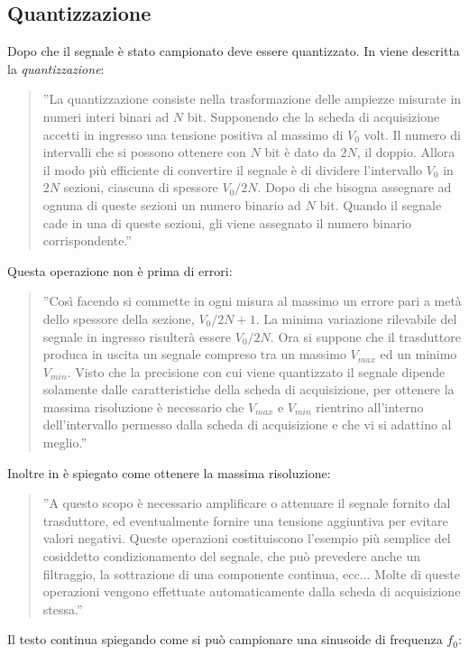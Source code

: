 \documentclass[a4paper]{report} %
\begin{document}
\subsection{Quantizzazione}
Dopo che il segnale è stato campionato deve essere quantizzato. In \cite{art:rif.2} viene descritta la \textit{quantizzazione}:
\begin{quote}
	''La quantizzazione consiste nella trasformazione delle ampiezze misurate in numeri interi binari ad $N$ bit. Supponendo che la scheda di acquisizione accetti in ingresso una tensione positiva al massimo di $ V_{0} $ volt. Il numero di intervalli che si possono ottenere con $N$ bit è dato da $2N$, il doppio. Allora il modo più efficiente di convertire il segnale è di dividere l'intervallo $ V_{0} $ in $2N$ sezioni, ciascuna di spessore $ V_{0}/2N $. Dopo di che bisogna assegnare ad ognuna di queste sezioni un numero binario ad $N$ bit. Quando il segnale cade in una di queste sezioni, gli viene assegnato il numero binario corrispondente.''
\end{quote}
Questa operazione non è prima di errori:
\begin{quote}	
	 ''Così facendo si commette in ogni misura al massimo un errore pari a metà dello spessore della sezione, $ V_{0}/2N+1 $. La minima variazione rilevabile del segnale in ingresso risulterà essere $ V_{0}/2N $. Ora si suppone che il trasduttore produca in uscita un segnale compreso tra un massimo $ V_{max} $ ed un minimo $ V_{min} $. Visto che la precisione con cui viene quantizzato il segnale dipende solamente dalle caratteristiche della scheda di acquisizione, per ottenere la massima risoluzione è necessario che $V_{max}$ e $V_{min}$ rientrino all'interno dell'intervallo permesso dalla scheda di acquisizione e che vi si adattino al meglio.''
\end{quote}	 
Inoltre in \cite{art:rif.2} è spiegato come ottenere la massima risoluzione:
\begin{quote}	  
	''A questo scopo è necessario amplificare o attenuare il segnale fornito dal trasduttore, ed eventualmente fornire una tensione aggiuntiva per evitare valori negativi. Queste operazioni costituiscono l'esempio più semplice del cosiddetto condizionamento del segnale, che può prevedere anche un filtraggio, la sottrazione di una componente continua, ecc... Molte di queste operazioni vengono effettuate automaticamente dalla scheda di acquisizione stessa.''
\end{quote}
Il testo continua spiegando come si può campionare una sinusoide di frequenza $f_{0}$:
\end{document}
